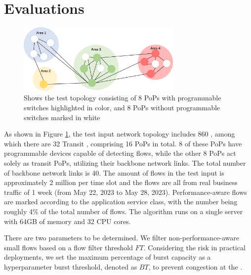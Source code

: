 

\section{Evaluations} \label{Evaluation}

\begin{figure}
	\centering
	\includegraphics[width = 8cm]{figs/architecture/Topology.jpg}
	\caption{\small Shows the test topology consisting of 8 PoPs with programmable switches highlighted in color, and 8 PoPs without programmable switches marked in white}
	\label{fig:topo}
\end{figure}

As shown in Figure \ref{fig:topo}, the test input network topology includes 860 {\egresses}, among which there are 32 Transit {\egresses}, comprising 16 PoPs in total. 8 of these PoPs have programmable devices capable of detecting flows, while the other 8 PoPs act solely as transit PoPs, utilizing their backbone network links. The total number of backbone network links is 40. The amount of flows in the test input is approximately 2 million per time slot and the flows are all from real business traffic of 1 week (from May 22, 2023 to May 28, 2023). Performance-aware flows are marked according to the application service class, with the number being roughly 4\% of the total number of flows. The algorithm runs on a single server with 64GB of memory and 32 CPU cores.



There are two parameters to be determined. We filter non-performance-aware small flows based on a flow filter threshold $FT$. 
Considering the risk in practical deployments, we set the maximum percentage of {\egress} burst capacity as a hyperparameter burst threshold, denoted as $BT$, to prevent congestion at the {\egresses}.

